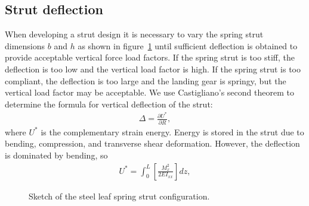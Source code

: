 \documentclass{AeroStructure-ERJohnson}
\begin{document}
\subsection{Strut deflection}\label{sec14.1.1}
When developing a strut design it is necessary to vary the spring strut dimensions $b$ and $h$ as shown in figure~\ref{fig14.1} until sufficient deflection is obtained to provide acceptable vertical force load factors. If the spring strut is too stiff, the deflection is too low and the vertical load factor is high. If the spring strut is too compliant, the deflection is too large and the landing gear is springy, but the vertical load factor may be acceptable. We use Castigliano's second theorem to determine the formula for vertical deflection of the strut:
\begin{align}\label{eq14.1}
\Delta=\frac{\partial U^{*}}{\partial R},
\end{align}
where $U^{*}$ is the complementary strain energy. Energy is stored in the strut due to bending, compression, and transverse shear deformation. However, the deflection is dominated by bending, so
\begin{align}\label{eq14.2}
U^{*}=\int_{0}^{L}\left[\frac{M_{x}^{2}}{2 E I_{x x}}\right] d z,
\end{align}

{\def\thefigure{14.1}
\begin{figure}
\caption{Sketch of the steel leaf spring strut configuration.\label{fig14.1}}
\end{figure}}
\end{document}
